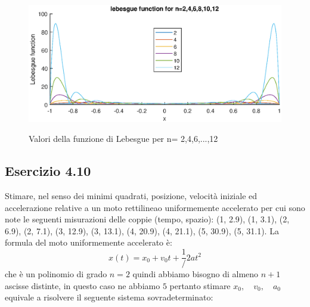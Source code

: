 \begin{figure}[h!]
    \centering
    \includegraphics[scale=0.7]{./capitolo_4/exercise_4_9_lebesgue}
    \label{fig:4_9_lebesgue}
    \caption{Valori della funzione di Lebesgue per n= 2,4,6,...,12}
\end{figure}



	\subsection {Esercizio 4.10}

Stimare, nel senso dei minimi quadrati, posizione, velocità iniziale ed accelerazione relative a un moto rettilineao uniformemente accelerato per cui sono note le seguenti misurazioni delle coppie (tempo, spazio): (1, 2.9), (1, 3.1), (2, 6.9), (2, 7.1), (3, 12.9), (3, 13.1), (4, 20.9), (4, 21.1), (5, 30.9), (5, 31.1).
\PP
La formula del moto uniformemente accelerato è:
\begin{equation*}
	x(t) = x_0 + v_0t +\frac{1}/{2}at^2
\end{equation*}
che è un polinomio di grado $n=2$ quindi abbiamo bisogno di almeno $n+1$ ascisse distinte, in questo caso ne abbiamo $5$ pertanto stimare $x_0, \quad v_0, \quad a_0$ equivale a risolvere il seguente sistema sovradeterminato:

